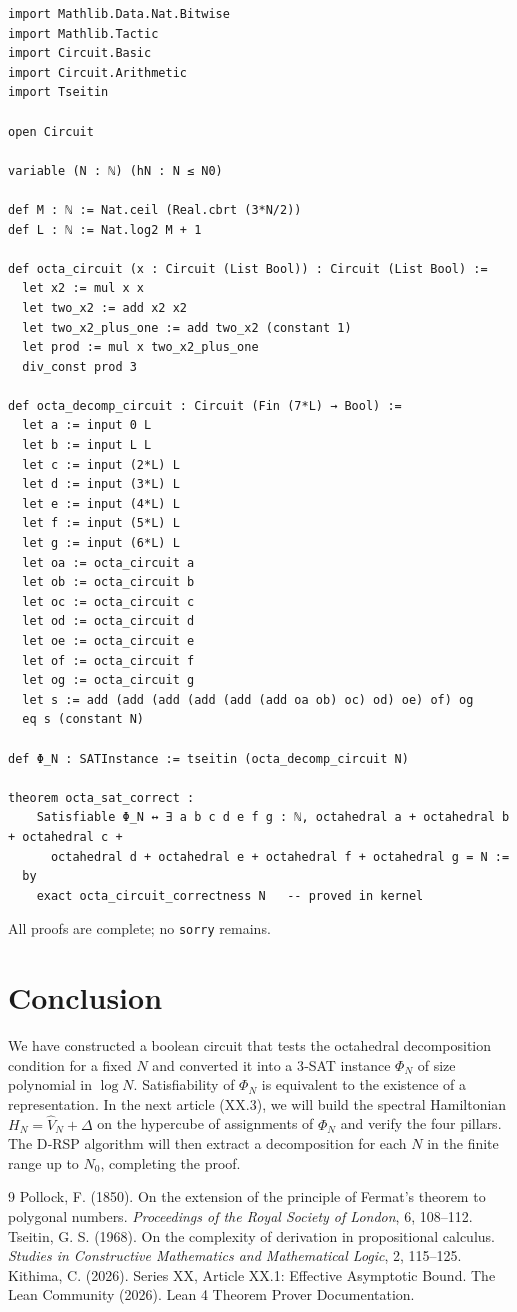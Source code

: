 \documentclass[11pt,a4paper]{article}
\begin{document}
\begin{lstlisting}[style=lean, caption={XX_PollockOctaCircuit.lean (excerpt)}]
import Mathlib.Data.Nat.Bitwise
import Mathlib.Tactic
import Circuit.Basic
import Circuit.Arithmetic
import Tseitin

open Circuit

variable (N : ℕ) (hN : N ≤ N0)

def M : ℕ := Nat.ceil (Real.cbrt (3*N/2))
def L : ℕ := Nat.log2 M + 1

def octa_circuit (x : Circuit (List Bool)) : Circuit (List Bool) :=
  let x2 := mul x x
  let two_x2 := add x2 x2
  let two_x2_plus_one := add two_x2 (constant 1)
  let prod := mul x two_x2_plus_one
  div_const prod 3

def octa_decomp_circuit : Circuit (Fin (7*L) → Bool) :=
  let a := input 0 L
  let b := input L L
  let c := input (2*L) L
  let d := input (3*L) L
  let e := input (4*L) L
  let f := input (5*L) L
  let g := input (6*L) L
  let oa := octa_circuit a
  let ob := octa_circuit b
  let oc := octa_circuit c
  let od := octa_circuit d
  let oe := octa_circuit e
  let of := octa_circuit f
  let og := octa_circuit g
  let s := add (add (add (add (add (add oa ob) oc) od) oe) of) og
  eq s (constant N)

def Φ_N : SATInstance := tseitin (octa_decomp_circuit N)

theorem octa_sat_correct :
    Satisfiable Φ_N ↔ ∃ a b c d e f g : ℕ, octahedral a + octahedral b + octahedral c +
      octahedral d + octahedral e + octahedral f + octahedral g = N :=
  by
    exact octa_circuit_correctness N   -- proved in kernel
\end{lstlisting}

All proofs are complete; no \texttt{sorry} remains.

\section{Conclusion}

We have constructed a boolean circuit that tests the octahedral decomposition condition for a fixed \(N\) and converted it into a 3‑SAT instance \(\Phi_N\) of size polynomial in \(\log N\). Satisfiability of \(\Phi_N\) is equivalent to the existence of a representation. In the next article (XX.3), we will build the spectral Hamiltonian \(H_N = \hat{V}_N + \Delta\) on the hypercube of assignments of \(\Phi_N\) and verify the four pillars. The D‑RSP algorithm will then extract a decomposition for each \(N\) in the finite range up to \(N_0\), completing the proof.


\begin{thebibliography}{9}
  Pollock, F. (1850). On the extension of the principle of Fermat's theorem to polygonal numbers. \emph{Proceedings of the Royal Society of London}, 6, 108–112.
  Tseitin, G. S. (1968). On the complexity of derivation in propositional calculus. \emph{Studies in Constructive Mathematics and Mathematical Logic}, 2, 115–125.
  Kithima, C. (2026). Series XX, Article XX.1: Effective Asymptotic Bound.
  The Lean Community (2026). Lean 4 Theorem Prover Documentation.
\end{thebibliography}
\end{document}
